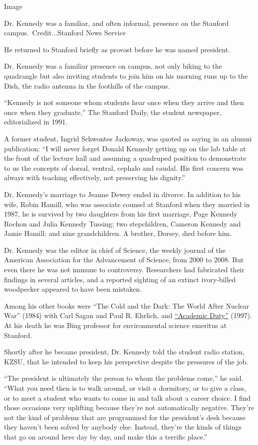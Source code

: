 Image

Dr. Kennedy was a familiar, and often informal, presence on the Stanford
campus.~Credit...Stanford News Service

He returned to Stanford briefly as provost before he was named
president.

Dr. Kennedy was a familiar presence on campus, not only biking to the
quadrangle but also inviting students to join him on his morning runs up
to the Dish, the radio antenna in the foothills of the campus.

``Kennedy is not someone whom students hear once when they arrive and
then once when they graduate,'' The Stanford Daily, the student
newspaper, editorialized in 1991.

A former student, Ingrid Schwontes Jackoway, was quoted as saying in an
alumni publication: ``I will never forget Donald Kennedy getting up on
the lab table at the front of the lecture hall and assuming a quadruped
position to demonstrate to us the concepts of dorsal, ventral, cephalo
and caudal. His first concern was always with teaching effectively, not
preserving his dignity.''

Dr. Kennedy's marriage to Jeanne Dewey ended in divorce. In addition to
his wife, Robin Hamill, who was associate counsel at Stanford when they
married in 1987, he is survived by two daughters from his first
marriage, Page Kennedy Rochon and Julia Kennedy Tussing; two
stepchildren, Cameron Kennedy and Jamie Hamill; and nine grandchildren.
A brother, Dorsey, died before him.

Dr. Kennedy was the editor in chief of Science, the weekly journal of
the American Association for the Advancement of Science, from 2000 to
2008. But even there he was not immune to controversy. Researchers had
fabricated their findings in several articles, and a reported sighting
of an extinct ivory-billed woodpecker appeared to have been mistaken.

Among his other books were ``The Cold and the Dark: The World After
Nuclear War'' (1984) with Carl Sagan and Paul R. Ehrlich, and
\href{https://www.nytimes.com/1998/01/04/books/beyond-the-culture-wars.html}{``Academic
Duty''} (1997). At his death he was Bing professor for environmental
science emeritus at Stanford.

Shortly after he became president, Dr. Kennedy told the student radio
station, KZSU, that he intended to keep his perspective despite the
pressures of the job.

``The president is ultimately the person to whom the problems come,'' he
said. ``What you need then is to walk around, or visit a dormitory, or
to give a class, or to meet a student who wants to come in and talk
about a career choice. I find those occasions very uplifting because
they're not automatically negative. They're not the kind of problems
that are programmed for the president's desk because they haven't been
solved by anybody else. Instead, they're the kinds of things that go on
around here day by day, and make this a terrific place.''

